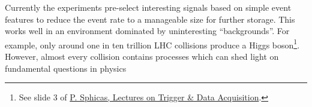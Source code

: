 Currently the experiments pre-select interesting signals based on simple event features to reduce the event rate to a manageable size for further storage. This works well in an environment dominated by uninteresting ``backgrounds''.
For example, only around one in ten trillion LHC collisions produce a Higgs boson\footnote{See slide 3 of \href{https://indico.cern.ch/event/a062849/material/1/1.pdf}{P. Sphicas, Lectures on Trigger \& Data Acquisition}.}.
However, almost every collision contains processes which can shed light on fundamental questions in physics


